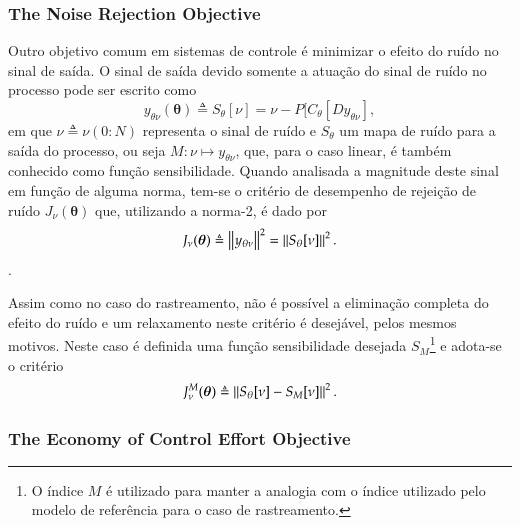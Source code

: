 \subsubsection{The Noise Rejection Objective}%
\label{sub:the_noise_rejection_objective}

Outro objetivo comum em sistemas de controle é minimizar o efeito do ruído no sinal de saída. O sinal de saída devido somente a atuação do sinal de ruído no processo pode ser escrito como
\begin{equation}
   y_{\theta\nu}(\bm{\theta}) \triangleq S_\theta[\nu] = \nu-P[C_\theta[Dy_{\theta\nu}],
\end{equation}
em que $\nu \triangleq \nu(0{:}N)$ representa o sinal de ruído e $S_{\theta}$ um mapa de ruído para a saída do processo, ou seja $M:\nu \mapsto y_{\theta\nu}$, que, para o caso linear, é também conhecido como função sensibilidade. Quando analisada a magnitude deste sinal em função de alguma norma, tem-se o critério de desempenho de rejeição de ruído $J_\nu(\bm{\theta})$ que, utilizando a norma-2, é dado por
\begin{equation}
   J_\nu(\bm{\theta}) \triangleq \left\lVert y_{\theta\nu} \right\rVert^2 = \left\lVert S_\theta[\nu] \right\rVert^2.
   \label{eq:Jnoise}
\end{equation}.

Assim como no caso do rastreamento, não é possível a eliminação completa do efeito do ruído e um relaxamento neste critério é desejável, pelos mesmos motivos. Neste caso é definida uma função sensibilidade desejada $S_{M}$\footnote{O índice $M$ é utilizado para manter a analogia com o índice utilizado pelo modelo de referência para o caso de rastreamento.} e adota-se o critério
\begin{equation}
   J_\nu^{M}(\bm{\theta}) \triangleq  \left\lVert S_\theta[\nu] - S_M[\nu]\right\rVert^{2}.
   \label{eq:JeRM}
\end{equation}





\subsubsection{The Economy of Control Effort Objective}%
\label{sub:the_economy_of_control_effot_objective}

